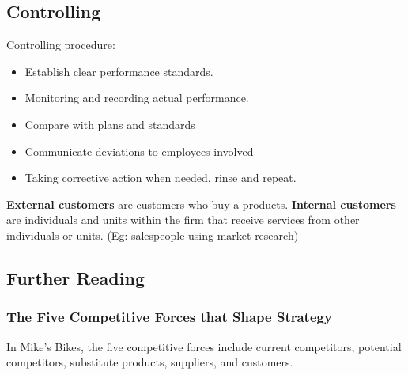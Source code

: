 \documentclass[english, 12pt]{article}
\begin{document}
\subsection{Controlling}
Controlling procedure:
\begin{itemize}
\item Establish clear performance standards.
\item Monitoring and recording actual performance.
\item Compare with plans and standards
\item Communicate deviations to employees involved
\item Taking corrective action when needed, rinse and repeat.
\end{itemize}
\begin{defn}
\textbf{External customers} are customers who buy a products. \textbf{Internal customers} are individuals and units within the firm that receive services from other individuals or units. (Eg: salespeople using market research)
\end{defn}
\subsection*{Further Reading}
\subsubsection*{The Five Competitive Forces that Shape Strategy}
In Mike's Bikes, the five competitive forces include current competitors, potential competitors, substitute products, suppliers, and customers.
\end{document}
